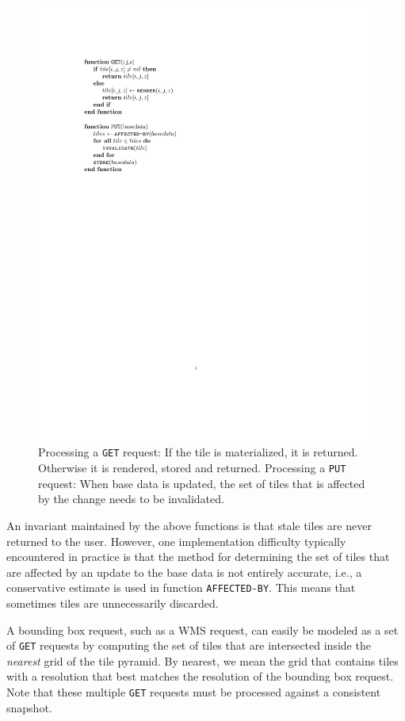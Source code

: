 \documentclass[11pt, oneside]{report}
\begin{document}
\begin{figure}[ht]
\includegraphics[scale=0.9]{figs-tileheat/pseudocode}
\caption{Processing a \texttt{GET} request: If the tile is materialized, it is returned. Otherwise it is rendered, stored and returned. Processing a \texttt{PUT} request: When base data is updated, the set of tiles that is affected by the change needs to be invalidated.}
\label{fig:pseudocode}
\end{figure}

An invariant maintained by the above functions is that stale tiles are never returned to the user. However, one implementation difficulty typically encountered in practice is that the method for determining the set of tiles that are affected by an update to the base data is not entirely accurate, i.e., a conservative estimate is used in function \texttt{AFFECTED-BY}. This means that sometimes tiles are unnecessarily discarded.

A bounding box request, such as a WMS request, can easily be modeled as a set of \texttt{GET} requests by computing the set of tiles that are intersected inside the \emph{nearest} grid of the tile pyramid. By nearest, we mean the grid that contains tiles with a resolution that best matches the resolution of the bounding box request. Note that these multiple \texttt{GET} requests must be processed against a consistent snapshot. 
\end{document}
